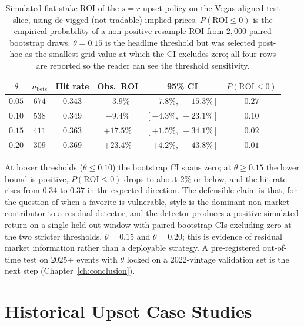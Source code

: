 \documentclass[12pt,oneside]{report}
\begin{document}
\begin{table}[ht]
\centering
\caption{Simulated flat-stake ROI of the $s = r$ upset policy on
the Vegas-aligned test slice, using de-vigged (not tradable)
implied prices.  $P(\mathrm{ROI} \le 0)$ is the empirical probability
of a non-positive resample ROI from $2{,}000$ paired bootstrap
draws.  \(\theta = 0.15\) is the headline threshold but was selected
post-hoc as the smallest grid value at which the CI excludes zero;
all four rows are reported so the reader can see the threshold
sensitivity.}
\label{tab:roi}
\begin{tabular}{cccccc}
\toprule
\(\theta\) & $n_{\text{bets}}$ & Hit rate & Obs.\ ROI & 95\% CI & $P(\mathrm{ROI} \le 0)$ \\
\midrule
$0.05$ & $674$ & $0.343$ & $+3.9\%$  & $[-7.8\%,\ +15.3\%]$ & $0.27$ \\
$0.10$ & $538$ & $0.349$ & $+9.4\%$  & $[-4.3\%,\ +23.1\%]$ & $0.10$ \\
$0.15$ & $411$ & $0.363$ & $+17.5\%$ & $[+1.5\%,\ +34.1\%]$ & $0.02$ \\
$0.20$ & $309$ & $0.369$ & $+23.4\%$ & $[+4.2\%,\ +43.8\%]$ & $0.01$ \\
\bottomrule
\end{tabular}
\end{table}

At looser thresholds (\(\theta \le 0.10\)) the bootstrap CI spans zero;
at \(\theta \ge 0.15\) the lower bound is positive, $P(\mathrm{ROI} \le
0)$ drops to about $2\%$ or below, and the hit rate rises from $0.34$ to $0.37$
in the expected direction.  The defensible
claim is that, for the question of when a favorite is vulnerable,
style is
the dominant non-market contributor to a residual detector, and the
detector produces a positive simulated return on a single held-out
window with paired-bootstrap CIs excluding zero at the two stricter
thresholds, \(\theta = 0.15\) and \(\theta = 0.20\); this is evidence of
residual market information rather than a deployable strategy.  A pre-registered
out-of-time test on 2025+ events with \(\theta\) locked on a
$2022$-vintage validation set is the next step
(Chapter~\ref{ch:conclusion}).

\chapter{Historical Upset Case Studies}\label{ch:cases}
\end{document}
